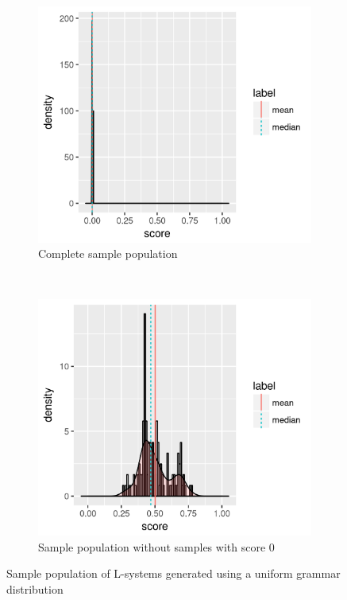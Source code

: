 \begin{figure}
    \centering
    \begin{subfigure}{0.48\textwidth}
        \includegraphics[width=\textwidth]{figures/uniform-population}
        \caption{Complete sample population}
        \label{fig:uniform-population}
    \end{subfigure}
    ~
    \begin{subfigure}{0.48\textwidth}
        \includegraphics[width=\textwidth]{figures/uniform-population-no0}
        \caption{Sample population without samples with score 0}
        \label{fig:uniform-population-no0}
    \end{subfigure}
    \caption[L-system population from a uniform grammar distribution]{Sample population of L-systems generated using a uniform grammar distribution}
\end{figure}

